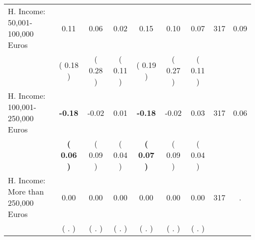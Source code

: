 \begin{tabular}{lcccccccc}
H. Income: 50,001-100,000 Euros &      0.11 &      0.06 &      0.02 &      0.15 &      0.10 &      0.07 & 317 &       0.09 \\ 
 & (     0.18 ) & (     0.28 ) & (     0.11 ) & (     0.19 ) & (     0.27 ) & (     0.11 ) & \\
H. Income: 100,001-250,000 Euros & \textbf{    -0.18} &     -0.02 &      0.01 & \textbf{    -0.18} &     -0.02 &      0.03 & 317 &       0.06 \\ 
 & \textbf{(     0.06 )} & (     0.09 ) & (     0.04 ) & \textbf{(     0.07 )} & (     0.09 ) & (     0.04 ) & \\
H. Income: More than 250,000 Euros &      0.00 &      0.00 &      0.00 &      0.00 &      0.00 &      0.00 & 317 &          . \\ 
 & (        . ) & (        . ) & (        . ) & (        . ) & (        . ) & (        . ) & \\
\bottomrule
\end{tabular}
